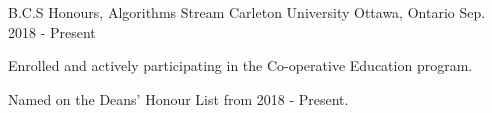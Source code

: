 



\begin{cventries}

  \cventry
    {B.C.S Honours, Algorithms Stream} %
    {Carleton University} %
    {Ottawa, Ontario} %
    {Sep. 2018 - Present} %
    {
      \begin{cvitems} %
        \item {Enrolled and actively participating in the Co-operative Education program.}
        \item {Named on the Deans' Honour List from 2018 - Present.}
      \end{cvitems}
    }

\end{cventries}
